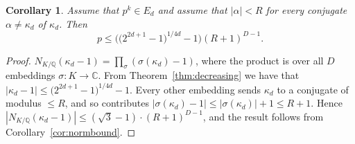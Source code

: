 \documentclass{article}
\theoremstyle{plain}
\newtheorem{corollary}[theorem]{Corollary}
\theoremstyle{definition}
\theoremstyle{remark}
\newtheorem{remark}[theorem]{Remark}
\newcommand{\Q}{\mathbb{Q}}
\newcommand{\C}{\mathbb{C}}
\begin{document}
\begin{corollary}\label{thm:normbound}
    Assume that $p ^k \in E_d$ and assume that $|\alpha|<R$ for every conjugate $\alpha \neq \kappa_d$ of $\kappa_d$. Then $$p \leq \big(\big(2^{2d+1}-1\big)^{1/4d}-1\big)(R+1)^{D-1}.$$ 
\end{corollary}

\begin{proof}
    $N_{K/\Q}(\kappa_d-1)=\prod_\sigma(\sigma(\kappa_d)-1)$, where the product is over all $D$ embeddings $\sigma:K\to\C$. From Theorem~\ref{thm:decreasing} we have that $|\kappa_d-1|\le \big(2^{2d+1}-1\big)^{1/4d}-1$. Every other embedding sends $\kappa_d$ to a conjugate of modulus $\le R$, and so contributes $|\sigma(\kappa_d)-1|\le|\sigma(\kappa_d)|+1\le R+1$. Hence $|N_{K/\Q}(\kappa_d-1)|\le(\sqrt3-1)\cdot (R+1)^{D-1}$, and the result follows from Corollary~\ref{cor:normbound}.
\end{proof}


\end{document}
